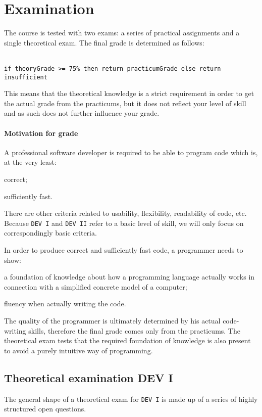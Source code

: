 \documentclass[12pt,a4paper,final]{article}
\begin{document}
\section{Examination}
The course is tested with two exams: a series of practical assignments and a single theoretical exam. The final grade is determined as follows:

\ \\

\texttt{if theoryGrade >= 75\% then return practicumGrade else return insufficient}

This means that the theoretical knowledge is a strict requirement in order to get the actual grade from the practicums, but it does not reflect your level of skill and as such does not further influence your grade.

\paragraph*{Motivation for grade}
A professional software developer is required to be able to program code which is, at the very least:
\begin{inparaenum}
\item correct;
\item sufficiently fast.
\end{inparaenum}

There are other criteria related to usability, flexibility, readability of code, etc. Because \texttt{DEV I} and \texttt{DEV II} refer to a basic level of skill, we will only focus on correspondingly basic criteria.

In order to produce correct and sufficiently fast code, a programmer needs to show:
\begin{inparaenum}
\item a foundation of knowledge about how a programming language actually works in connection with a simplified concrete model of a computer;
\item fluency when actually writing the code.
\end{inparaenum}

The quality of the programmer is ultimately determined by his actual code-writing skills, therefore the final grade comes only from the practicums. The theoretical exam tests that the required foundation of knowledge is also present to avoid a purely intuitive way of programming.


\subsection{Theoretical examination DEV I}
The general shape of a theoretical exam for \texttt{DEV I} is made up of a series of highly structured open questions.
\end{document}
